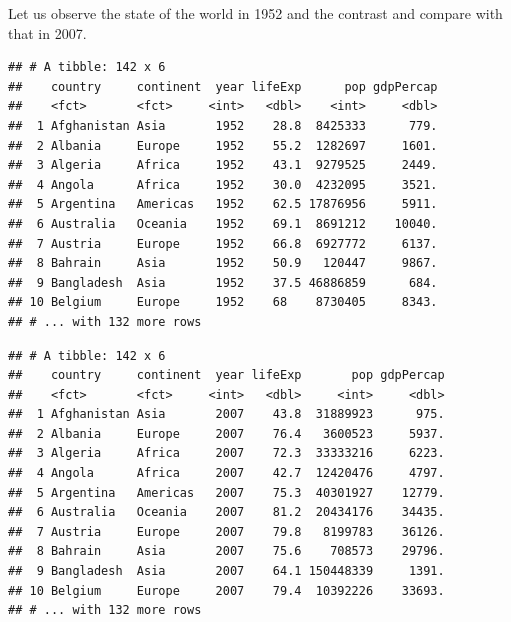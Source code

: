 \documentclass[]{article}
\newenvironment{Shaded}{\begin{snugshade}}{\end{snugshade}}
\newcommand{\KeywordTok}[1]{\textcolor[rgb]{0.13,0.29,0.53}{\textbf{#1}}}
\newcommand{\DecValTok}[1]{\textcolor[rgb]{0.00,0.00,0.81}{#1}}
\newcommand{\StringTok}[1]{\textcolor[rgb]{0.31,0.60,0.02}{#1}}
\newcommand{\CommentTok}[1]{\textcolor[rgb]{0.56,0.35,0.01}{\textit{#1}}}
\newcommand{\OperatorTok}[1]{\textcolor[rgb]{0.81,0.36,0.00}{\textbf{#1}}}
\newcommand{\NormalTok}[1]{#1}
\begin{document}
Let us observe the state of the world in 1952 and the contrast and
compare with that in 2007.

\begin{Shaded}
\end{Shaded}

\begin{verbatim}
## # A tibble: 142 x 6
##    country     continent  year lifeExp      pop gdpPercap
##    <fct>       <fct>     <int>   <dbl>    <int>     <dbl>
##  1 Afghanistan Asia       1952    28.8  8425333      779.
##  2 Albania     Europe     1952    55.2  1282697     1601.
##  3 Algeria     Africa     1952    43.1  9279525     2449.
##  4 Angola      Africa     1952    30.0  4232095     3521.
##  5 Argentina   Americas   1952    62.5 17876956     5911.
##  6 Australia   Oceania    1952    69.1  8691212    10040.
##  7 Austria     Europe     1952    66.8  6927772     6137.
##  8 Bahrain     Asia       1952    50.9   120447     9867.
##  9 Bangladesh  Asia       1952    37.5 46886859      684.
## 10 Belgium     Europe     1952    68    8730405     8343.
## # ... with 132 more rows
\end{verbatim}

\begin{Shaded}
\end{Shaded}

\begin{verbatim}
## # A tibble: 142 x 6
##    country     continent  year lifeExp       pop gdpPercap
##    <fct>       <fct>     <int>   <dbl>     <int>     <dbl>
##  1 Afghanistan Asia       2007    43.8  31889923      975.
##  2 Albania     Europe     2007    76.4   3600523     5937.
##  3 Algeria     Africa     2007    72.3  33333216     6223.
##  4 Angola      Africa     2007    42.7  12420476     4797.
##  5 Argentina   Americas   2007    75.3  40301927    12779.
##  6 Australia   Oceania    2007    81.2  20434176    34435.
##  7 Austria     Europe     2007    79.8   8199783    36126.
##  8 Bahrain     Asia       2007    75.6    708573    29796.
##  9 Bangladesh  Asia       2007    64.1 150448339     1391.
## 10 Belgium     Europe     2007    79.4  10392226    33693.
## # ... with 132 more rows
\end{verbatim}
\end{document}
